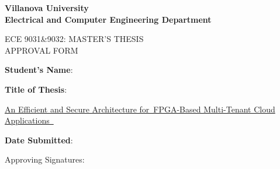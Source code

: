 

\newcommand{\ulfrule}{\xleaders\hbox{\underline{ }}\hfill\kern0pt}

\begin{center}
\bfseries
Villanova University\\
Electrical and Computer Engineering Department

\vspace{1cm}

\uppercase{ECE 9031\&9032: Master's Thesis\\ Approval Form}
\end{center}

\vspace*{0.30cm} 
\noindent \textbf{Student's Name}: \underline{} \\ %
  
\vspace{1cm}
\noindent

\noindent \textbf{ Title of Thesis}: \parbox{260pt}{\underline{\quad An Efficient and Secure Architecture for}\ulfrule{}\newline\underline{\quad FPGA-Based Multi-Tenant Cloud Applications}\ulfrule{}}

\vspace{1cm}
\noindent
\noindent \textbf{Date Submitted}: \underline{} \ 


\vspace{1cm}
\noindent Approving Signatures:\\
\vspace{.5in}



